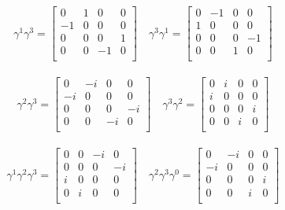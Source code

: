 \begin{align*}
\gamma^1 \gamma^3 = \begin{bmatrix}
 0  &  1  &  0  &  0  \\
 -1  &  0  &  0  &  0  \\
 0  &  0  &  0  &  1  \\
 0  &  0  &  -1  &  0  \\
\end{bmatrix} \quad
\gamma^3 \gamma^1 = \begin{bmatrix}
 0  &  -1  &  0  &  0  \\
 1  &  0  &  0  &  0  \\
 0  &  0  &  0  &  -1  \\
 0  &  0  &  1  &  0  \\
\end{bmatrix}
\end{align*}

\begin{align*}
\gamma^2 \gamma^3 = \begin{bmatrix}
 0  &  -i  &  0  &  0  \\
 -i  &  0  &  0  &  0  \\
 0  &  0  &  0  &  -i  \\
 0  &  0  &  -i  &  0  \\
\end{bmatrix} \quad
\gamma^3 \gamma^2 = \begin{bmatrix}
 0  &  i  &  0  &  0  \\
 i  &  0  &  0  &  0  \\
 0  &  0  &  0  &  i  \\
 0  &  0  &  i  &  0  \\
\end{bmatrix}
\end{align*}

\begin{align*}
\gamma^1 \gamma^2 \gamma^3 = \begin{bmatrix}
 0  &  0  &  -i  &  0  \\
 0  &  0  &  0  &  -i  \\
 i  &  0  &  0  &  0  \\
 0  &  i  &  0  &  0  \\
\end{bmatrix} \quad
\gamma^2 \gamma^3 \gamma^0 = \begin{bmatrix}
 0  &  -i  &  0  &  0  \\
 -i  &  0  &  0  &  0  \\
 0  &  0  &  0  &  i  \\
 0  &  0  &  i  &  0  \\
\end{bmatrix}
\end{align*}

